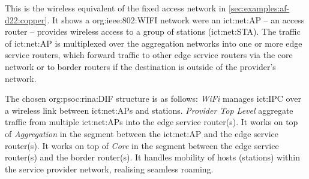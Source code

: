 This is the wireless equivalent of the fixed access network in \autoref{sec:examples:af-d22:copper}.
It shows a \acs{org:ieee:802:WIFI} network were an \ac{ict:net:AP} -- an access router -- provides wireless access to a group of stations (\acs{ict:net:STA}).
The traffic of \ac{ict:net:AP} is multiplexed over the aggregation networks into one or more edge service routers, which forward traffic to other edge service routers via the core network or to border routers if the destination is outside of the provider's network.

The chosen \acs{org:psoc:rina:DIF} structure is as follows:
\textit{WiFi} manages \ac{ict:IPC} over a wireless link between \acp{ict:net:AP} and stations.
\textit{Provider Top Level} aggregate traffic from multiple \acp{ict:net:AP} into the edge service router(s).
It works on top of \textit{Aggregation} in the segment between the \acs{ict:net:AP} and the edge service router(s).
It works on top of \textit{Core} in the segment between the edge service router(s) and the border router(s).
It handles mobility of hosts (stations) within the service provider network, realising seamless roaming.

